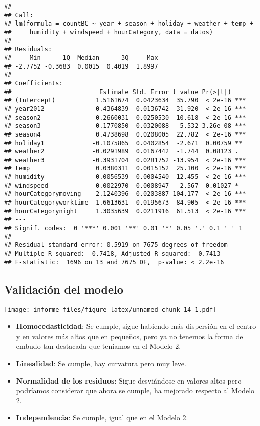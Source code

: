 \documentclass[
]{article}
\providecommand{\tightlist}{%
  \setlength{\itemsep}{0pt}\setlength{\parskip}{0pt}}
\begin{document}
\begin{verbatim}
## 
## Call:
## lm(formula = countBC ~ year + season + holiday + weather + temp + 
##     humidity + windspeed + hourCategory, data = datos)
## 
## Residuals:
##     Min      1Q  Median      3Q     Max 
## -2.7752 -0.3683  0.0015  0.4019  1.8997 
## 
## Coefficients:
##                        Estimate Std. Error t value Pr(>|t|)    
## (Intercept)           1.5161674  0.0423634  35.790  < 2e-16 ***
## year2012              0.4364839  0.0136742  31.920  < 2e-16 ***
## season2               0.2660031  0.0250530  10.618  < 2e-16 ***
## season3               0.1770850  0.0320088   5.532 3.26e-08 ***
## season4               0.4738698  0.0208005  22.782  < 2e-16 ***
## holiday1             -0.1075865  0.0402854  -2.671  0.00759 ** 
## weather2             -0.0291989  0.0167442  -1.744  0.08123 .  
## weather3             -0.3931704  0.0281752 -13.954  < 2e-16 ***
## temp                  0.0380311  0.0015152  25.100  < 2e-16 ***
## humidity             -0.0056539  0.0004540 -12.455  < 2e-16 ***
## windspeed            -0.0022970  0.0008947  -2.567  0.01027 *  
## hourCategorymoving    2.1240396  0.0203887 104.177  < 2e-16 ***
## hourCategoryworktime  1.6613631  0.0195673  84.905  < 2e-16 ***
## hourCategorynight     1.3035639  0.0211916  61.513  < 2e-16 ***
## ---
## Signif. codes:  0 '***' 0.001 '**' 0.01 '*' 0.05 '.' 0.1 ' ' 1
## 
## Residual standard error: 0.5919 on 7675 degrees of freedom
## Multiple R-squared:  0.7418, Adjusted R-squared:  0.7413 
## F-statistic:  1696 on 13 and 7675 DF,  p-value: < 2.2e-16
\end{verbatim}

\hypertarget{validaciuxf3n-del-modelo}{%
\subsection{Validación del modelo}\label{validaciuxf3n-del-modelo}}

\texttt{[image: informe\_files/figure-latex/unnamed-chunk-14-1.pdf]}

\begin{itemize}
\tightlist
\item
  \textbf{Homocedasticidad}: Se cumple, sigue habiendo más dispersión en
  el centro y en valores más altos que en pequeños, pero ya no tenemos
  la forma de embudo tan destacada que teníamos en el Modelo 2.
\item
  \textbf{Linealidad}: Se cumple, hay curvatura pero muy leve.
\item
  \textbf{Normalidad de los residuos}: Sigue desviándose en valores
  altos pero podríamos considerar que ahora se cumple, ha mejorado
  respecto al Modelo 2.
\item
  \textbf{Independencia}: Se cumple, igual que en el Modelo 2.
\end{itemize}
\end{document}
